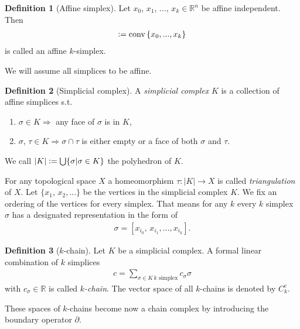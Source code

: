 \documentclass[12pt,a4paper]{article}
\theoremstyle{definition}
\newtheorem{definition}{Definition}
\newcommand{\real}{\mathbb{R}}
\begin{document}
\begin{definition}[Affine simplex]
    Let $x_0$, $x_1$, ..., $x_k \in \real^n$ be affine independent. Then 
    \begin{align*}
    [x_0,x_1,...,x_k] \vcentcolon= \text{conv}\,\{x_0,...,x_k\}
    \end{align*}
    is called an affine $k$-simplex.
\end{definition}
\noindent We will assume all simplices to be affine.

\begin{definition}[Simplicial complex]
    A \textit{simplicial complex} $K$ is a collection of affine simplices s.t.
    \begin{enumerate}
        \item $\sigma \in K \Rightarrow$ any face of $\sigma$ is in $K$,
        \item $\sigma,\, \tau \in K \Rightarrow \sigma \cap \tau$  
                is either empty or a face of both $\sigma$ and $\tau$.
    \end{enumerate}
    We call $|K| \vcentcolon= \bigcup \{ \sigma | \sigma \in K\}$ the polyhedron of 
    $K$.
\end{definition}
For any topological space $X$ a homeomorphism 
$\tau: |K| \rightarrow X$ is called \textit{triangulation} of $X$.
Let $\{x_1,\, x_2,...\}$ be the vertices in the simplicial complex $K$.
We fix an ordering of the vertices for every simplex. 
That means for any $k$ every $k$ simplex $\sigma$ has
a designated representation in the form of
\begin{align*}
    \sigma = [x_{i_0},\, x_{i_1}, ...,x_{i_k}].
\end{align*} 

\begin{definition}[$k$-chain]
    Let $K$ be a simplicial complex. A formal linear combination of $k$ 
    simplices
    \begin{align*}
        c = \sum\limits_{\sigma \in K\, k \text{ simplex}} c_\sigma \sigma
    \end{align*}
    with $c_\sigma \in \real$ is called \textit{$k$-chain}. The vector space 
    of all $k$-chains is denoted by ${C}^\text{c}_k$.
\end{definition}

These spaces of $k$-chains become now a chain complex by introducing the 
boundary operator $\partial$.
\end{document}
